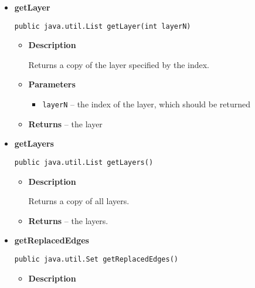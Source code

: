 {{{{{{{{{\begin{itemize}
{\begin{itemize}
{Assigns the specified vertex to the specified layer. A vertex must only be assigned to one layer at the time. When assigned to a new layer the vertex will be removed from layer it was assigned before.
}
\item{
{\bf  Parameters}
  \begin{itemize}
   \item{
\texttt{vertex} -- the vertex to assign to the layer}
   \item{
\texttt{layerN} -- the index of the layer}
  \end{itemize}
}%
\end{itemize}
}%
\item{ 
{\bf  getLayer}\\
\begin{lstlisting}[frame=none]
public java.util.List getLayer(int layerN)\end{lstlisting} %
\begin{itemize}
\item{
{\bf  Description}

Returns a copy of the layer specified by the index.
}
\item{
{\bf  Parameters}
  \begin{itemize}
   \item{
\texttt{layerN} -- the index of the layer, which should be returned}
  \end{itemize}
}%
\item{{\bf  Returns} -- 
the layer 
}%
\end{itemize}
}%
\item{ 
{\bf  getLayers}\\
\begin{lstlisting}[frame=none]
public java.util.List getLayers()\end{lstlisting} %
\begin{itemize}
\item{
{\bf  Description}

Returns a copy of all layers.
}
\item{{\bf  Returns} -- 
the layers. 
}%
\end{itemize}
}%
\item{ 
{\bf  getReplacedEdges}\\
\begin{lstlisting}[frame=none]
public java.util.Set getReplacedEdges()\end{lstlisting} %
\begin{itemize}
\item{
{\bf  Description}

}
\end{itemize}}
\end{itemize}}}}}}}}}}
